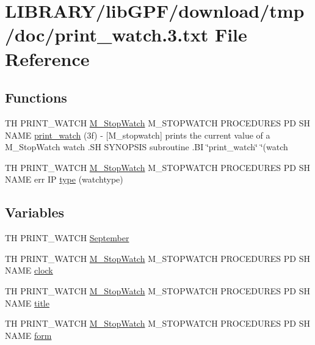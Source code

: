 \hypertarget{print__watch_83_8txt}{}\section{L\+I\+B\+R\+A\+R\+Y/lib\+G\+P\+F/download/tmp/doc/print\+\_\+watch.3.txt File Reference}
\label{print__watch_83_8txt}
\subsection*{Functions}
\begin{DoxyCompactItemize}
\item 
TH P\+R\+I\+N\+T\+\_\+\+W\+A\+T\+CH \hyperlink{option__stopwatch_83_8txt_aa2011fc45a5e502e87ee50996a8a9305}{M\+\_\+\+Stop\+Watch} M\+\_\+\+S\+T\+O\+P\+W\+A\+T\+CH P\+R\+O\+C\+E\+D\+U\+R\+ES PD SH N\+A\+ME \hyperlink{print__watch_83_8txt_a8615f1e2afa77ade01fc099f7805625e}{print\+\_\+watch} (3f) -\/ \mbox{[}\+M\+\_\+stopwatch\mbox{]} prints the current value of a M\+\_\+\+Stop\+Watch watch .\+S\+H S\+Y\+N\+O\+P\+S\+I\+S subroutine .\+B\+I \char`\"{}print\+\_\+watch\char`\"{} \char`\"{}(watch
\item 
TH P\+R\+I\+N\+T\+\_\+\+W\+A\+T\+CH \hyperlink{option__stopwatch_83_8txt_aa2011fc45a5e502e87ee50996a8a9305}{M\+\_\+\+Stop\+Watch} M\+\_\+\+S\+T\+O\+P\+W\+A\+T\+CH P\+R\+O\+C\+E\+D\+U\+R\+ES PD SH N\+A\+ME err IP \hyperlink{print__watch_83_8txt_abac438c111a8b03ed5b72e0e49efe1c0}{type} (watchtype)
\end{DoxyCompactItemize}
\subsection*{Variables}
\begin{DoxyCompactItemize}
\item 
TH P\+R\+I\+N\+T\+\_\+\+W\+A\+T\+CH \hyperlink{print__watch_83_8txt_a979898727a2377f66aeb90c0f2b7fb1f}{September}
\item 
TH P\+R\+I\+N\+T\+\_\+\+W\+A\+T\+CH \hyperlink{option__stopwatch_83_8txt_aa2011fc45a5e502e87ee50996a8a9305}{M\+\_\+\+Stop\+Watch} M\+\_\+\+S\+T\+O\+P\+W\+A\+T\+CH P\+R\+O\+C\+E\+D\+U\+R\+ES PD SH N\+A\+ME \hyperlink{print__watch_83_8txt_a6b008a5efeabe5de2785214b5e3ba69d}{clock}
\item 
TH P\+R\+I\+N\+T\+\_\+\+W\+A\+T\+CH \hyperlink{option__stopwatch_83_8txt_aa2011fc45a5e502e87ee50996a8a9305}{M\+\_\+\+Stop\+Watch} M\+\_\+\+S\+T\+O\+P\+W\+A\+T\+CH P\+R\+O\+C\+E\+D\+U\+R\+ES PD SH N\+A\+ME \hyperlink{print__watch_83_8txt_a15b5bd21156bb9fca6a755ab8c029a9c}{title}
\item 
TH P\+R\+I\+N\+T\+\_\+\+W\+A\+T\+CH \hyperlink{option__stopwatch_83_8txt_aa2011fc45a5e502e87ee50996a8a9305}{M\+\_\+\+Stop\+Watch} M\+\_\+\+S\+T\+O\+P\+W\+A\+T\+CH P\+R\+O\+C\+E\+D\+U\+R\+ES PD SH N\+A\+ME \hyperlink{print__watch_83_8txt_a8fdbaaece3b2ad2ab6982e68e7539f04}{form}
\end{DoxyCompactItemize}


